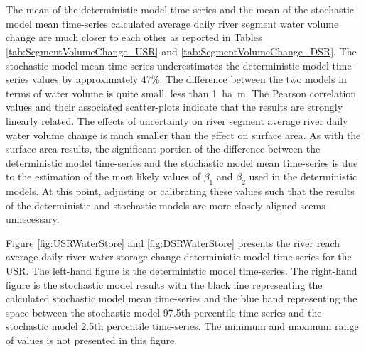 \begin{linenumbers}
\subtabletop
\begin{table}[htbp]
	\centering
	\caption[DSR river segment volume change deterministic and stochastic model numerical results.]{DSR river segment volume change deterministic and stochastic model numerical results.  Values are in hectare-meters (\si{\hectare\meter}) and the values in parentheses are in acres (\si{\acre}).}
	\label{tab:SegmentVolumeChange_DSR}
	\begin{subtable}{\textwidth}
		\centering
%		
	\end{subtable}\\
	\tablevspace	
	\begin{subtable}{\textwidth}
		\centering
%		
	\end{subtable}\\
\end{table}	

The mean of the deterministic model time-series and the mean of the stochastic model mean time-series calculated average daily river segment water volume change are much closer to each other as reported in Tables \ref{tab:SegmentVolumeChange_USR} and \ref{tab:SegmentVolumeChange_DSR}.  The stochastic model mean time-series underestimates the deterministic model time-series values by approximately 47\%.  The difference between the two models in terms of water volume is quite small, less than \SI{1}{\hectare\meter}.  The Pearson correlation values and their associated scatter-plots indicate that the results are strongly linearly related.  The effects of uncertainty on river segment average river daily water volume change is much smaller than the effect on surface area.  As with the surface area results, the significant portion of the difference between the deterministic model time-series and the stochastic model mean time-series is due to the estimation of the most likely values of $ \beta_1 $ and $ \beta_2 $ used in the deterministic models.  At this point, adjusting or calibrating these values such that the results of the deterministic and stochastic models are more closely aligned seems unnecessary.

Figure \ref{fig:USRWaterStore} and \ref{fig:DSRWaterStore} presents the river reach average daily river water storage change deterministic model time-series for the USR.  The left-hand figure is the deterministic model time-series.  The right-hand figure is the stochastic model results with the black line representing the calculated stochastic model mean time-series and the blue band representing the space between the stochastic model 97.5th percentile time-series and the stochastic model 2.5th percentile time-series.  The minimum and maximum range of values is not presented in this figure.


\end{linenumbers}
